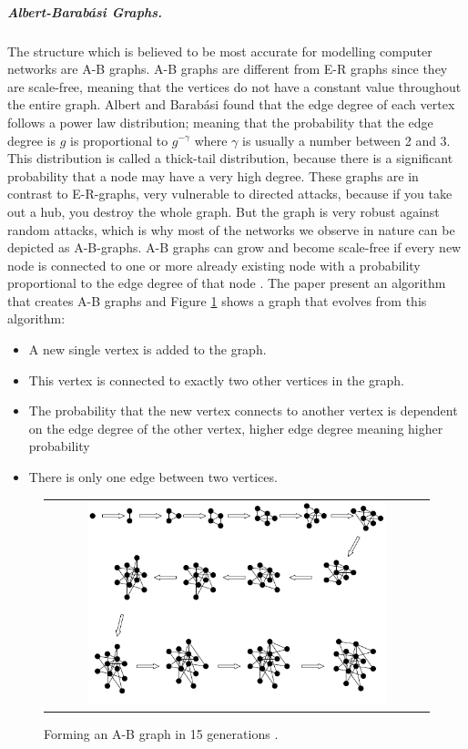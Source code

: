 \subparagraph{\label{ABgraph}Albert-Barabási Graphs.}
The structure which is believed to be most accurate for modelling computer networks are A-B graphs. A-B graphs are different from E-R graphs since they are scale-free, meaning that the vertices do not have a constant value throughout the entire graph. Albert and Barabási found that the edge degree of each vertex follows a power law distribution; meaning that the probability that the edge degree is $g$ is proportional to $g^{-\gamma}$
where $\gamma$ is usually a number between 2 and 3. This distribution is called a thick-tail distribution, because there is a significant probability that a node may have a very high degree. \cite{audestad}
These graphs are in contrast to E-R-graphs, very vulnerable to directed attacks, because if you take out a hub, you destroy the whole graph. But the graph is very robust against random attacks, which is why most of the networks we observe in nature can be depicted as A-B-graphs.
A-B graphs can grow and become scale-free if every new node is connected to one or more already existing node with a probability proportional to the edge degree of that node . The paper present an algorithm that creates A-B graphs and Figure \ref{fig:ABgraphcreation} shows a graph that evolves from this algorithm:

\begin{itemize}
\item A new single vertex is added to the graph.
\item This vertex is connected to exactly two other vertices in the graph.
\item The probability that the new vertex connects to another vertex is dependent on the edge degree of the other vertex, higher edge degree meaning higher probability
\item There is only one edge between two vertices.
\end{itemize}


\begin{figure}[h]
\centering
\begin{tabular}{@{}c@{}}
\includegraphics[width=0.8\textwidth]{../Figures/ABgraphcreation.png}
\end{tabular}
\caption{\label{fig:ABgraphcreation} Forming an A-B graph in 15 generations \cite{audestad}.}
\end{figure}

